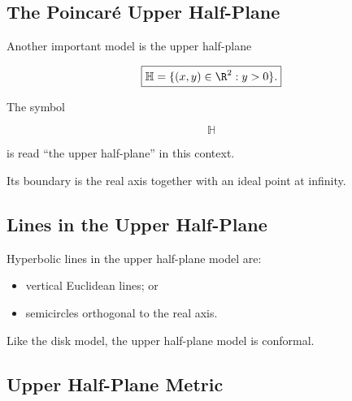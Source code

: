 \subsection{The Poincar\'e Upper Half-Plane}
\label{subsec:poincare-upper-half-plane}

Another important model is the upper half-plane

\[
\boxed{
\mathbb{H}
=
\{(x,y)\in\R^2:y>0\}.
}
\]

The symbol

\[
\mathbb{H}
\]

is read ``the upper half-plane'' in this context.

Its boundary is the real axis together with an ideal point at infinity.

\subsection{Lines in the Upper Half-Plane}
\label{subsec:upper-half-plane-lines}

Hyperbolic lines in the upper half-plane model are:

\begin{itemize}
    \item vertical Euclidean lines; or
    \item semicircles orthogonal to the real axis.
\end{itemize}

\begin{centereddiagram}
\end{centereddiagram}

Like the disk model, the upper half-plane model is conformal.

\subsection{Upper Half-Plane Metric}
\label{subsec:upper-half-plane-metric}

